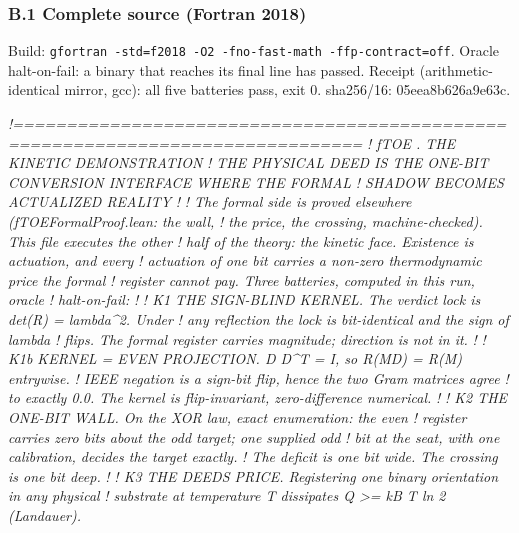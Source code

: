 \documentclass[10pt]{article}
\renewcommand{\_}{\origunderscore\allowbreak}
\newenvironment{Shaded}{}{}
\newcommand{\CommentTok}[1]{\textit{#1}}
\begin{document}
\hypertarget{b.1-complete-source-fortran-2018}{%
\subsubsection{B.1 Complete source (Fortran
2018)}\label{b.1-complete-source-fortran-2018}}

Build:
\texttt{gfortran\ -std=f2018\ -O2\ -fno-fast-math\ -ffp-contract=off}.
Oracle halt-on-fail: a binary that reaches its final line has passed.
Receipt (arithmetic-identical mirror, gcc): all five batteries pass,
exit 0. sha256/16: 05eea8b626a9e63c.

\begin{Shaded}
\begin{Highlighting}[]
\CommentTok{!===============================================================================}
\CommentTok{!  fTOE . THE KINETIC DEMONSTRATION}
\CommentTok{!  THE PHYSICAL DEED IS THE ONE{-}BIT CONVERSION INTERFACE WHERE THE FORMAL}
\CommentTok{!  SHADOW BECOMES ACTUALIZED REALITY}
\CommentTok{!}
\CommentTok{!  The formal side is proved elsewhere (fTOE\_Formal\_Proof.lean: the wall,}
\CommentTok{!  the price, the crossing, machine{-}checked). This file executes the other}
\CommentTok{!  half of the theory: the kinetic face. Existence is actuation, and every}
\CommentTok{!  actuation of one bit carries a non{-}zero thermodynamic price the formal}
\CommentTok{!  register cannot pay. Three batteries, computed in this run, oracle}
\CommentTok{!  halt{-}on{-}fail:}
\CommentTok{!}
\CommentTok{!  K1  THE SIGN{-}BLIND KERNEL. The verdict lock is det(R) = lambda\^{}2. Under}
\CommentTok{!      any reflection the lock is bit{-}identical and the sign of lambda}
\CommentTok{!      flips. The formal register carries magnitude; direction is not in it.}
\CommentTok{!}
\CommentTok{!  K1b KERNEL = EVEN PROJECTION. D D\^{}T = I, so R(MD) = R(M) entrywise.}
\CommentTok{!      IEEE negation is a sign{-}bit flip, hence the two Gram matrices agree}
\CommentTok{!      to exactly 0.0. The kernel is flip{-}invariant, zero{-}difference numerical.}
\CommentTok{!}
\CommentTok{!  K2  THE ONE{-}BIT WALL. On the XOR law, exact enumeration: the even}
\CommentTok{!      register carries zero bits about the odd target; one supplied odd}
\CommentTok{!      bit at the seat, with one calibration, decides the target exactly.}
\CommentTok{!      The deficit is one bit wide. The crossing is one bit deep.}
\CommentTok{!}
\CommentTok{!  K3  THE DEED\textquotesingle{}S PRICE. Registering one binary orientation in any physical}
\CommentTok{!      substrate at temperature T dissipates Q \textgreater{}= k\_B T ln 2 (Landauer).}

\end{Highlighting}
\end{Shaded}
\end{document}
